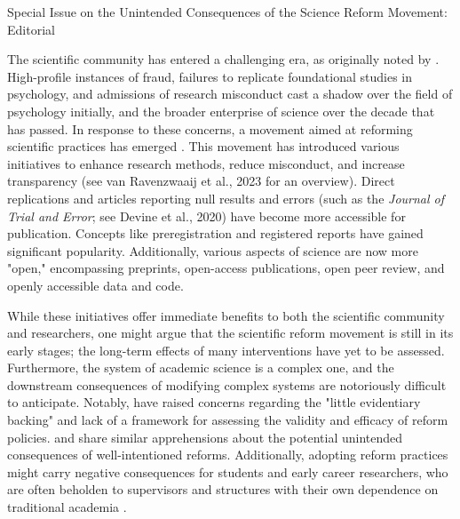 \documentclass[authordate, editorial,noabstract]{jote-new-article}
\author[1]{\mbox{Sarahanne Field\orcid{0000-0001-7874-1261}}}
\affil[1]{University of Groningen}
\author[2]{\mbox{Noah van Dongen\orcid{0000-0003-0387-7388}}}
\affil[2]{University of Amsterdam}
\author[3]{\mbox{Leonid Tiokhin\orcid{0000-0001-7333-0383}}}
\affil[3]{IG\&H: Utrecht}
\begin{document}
\begin{frontmatter}
  \maketitle
  \begin{abstract}
    \printabstracttext
  \end{abstract}
\end{frontmatter}


Special Issue on the Unintended Consequences of the Science Reform Movement: Editorial










	The scientific community has entered a challenging era, as originally noted by \textcite{Wagenmakers2012}. High-profile instances of fraud, failures to replicate foundational studies in psychology, and admissions of research misconduct \parencites[e.g.,][]{John2012} cast a shadow over the field of psychology initially, and the broader enterprise of science over the decade that has passed. In response to these concerns, a movement aimed at reforming scientific practices has emerged \parencites{Field2022}{Munafo2017}{Spellman2018}. This movement has introduced various initiatives to enhance research methods, reduce misconduct, and increase transparency (see van Ravenzwaaij et al., 2023 for an overview). Direct replications and articles reporting null results and errors (such as the\emph{ Journal of Trial and Error}; see Devine et al., 2020) have become more accessible for publication. Concepts like preregistration and registered reports have gained significant popularity. Additionally, various aspects of science are now more "open," encompassing preprints, open-access publications, open peer review, and openly accessible data and code.



While these initiatives offer immediate benefits to both the scientific community and researchers, one might argue that the scientific reform movement is still in its early stages; the long-term effects of many interventions have yet to be assessed. Furthermore, the system of academic science is a complex one, and the downstream consequences of modifying complex systems are notoriously difficult to anticipate. Notably, \textcite{Devezer2021} have raised concerns regarding the "little evidentiary backing" and lack of a framework for assessing the validity and efficacy of reform policies. \textcite{Ioannidis2014} and \textcite{Tiokhin2021} share similar apprehensions about the potential unintended consequences of well-intentioned reforms. Additionally, adopting reform practices might carry negative consequences for students and early career researchers, who are often beholden to supervisors and structures with their own dependence on traditional academia \parencites{Field2023}.
\end{document}
